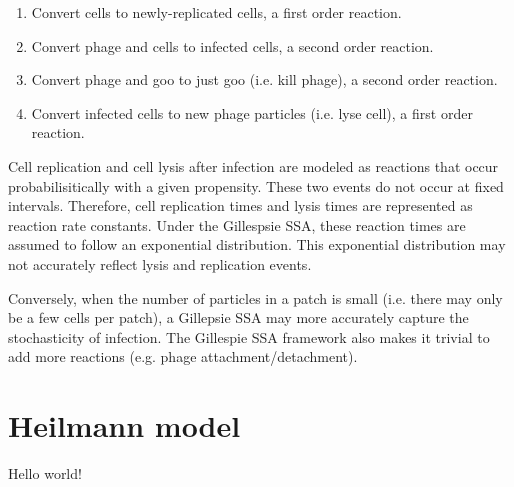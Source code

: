 \documentclass{article}
\begin{document}
\begin{enumerate}
    \item Convert cells to newly-replicated cells, a first order reaction.
    \item Convert phage and cells to infected cells, a second order reaction.
    \item Convert phage and goo to just goo (i.e. kill phage), a second order reaction.
    \item Convert infected cells to new phage particles (i.e. lyse cell), a first order reaction.
\end{enumerate}

Cell replication and cell lysis after infection are modeled as reactions that occur probabilisitically with a given propensity. These two events do not occur at fixed intervals. Therefore, cell replication times and lysis times are represented as reaction rate constants. Under the Gillespsie SSA, these reaction times are assumed to follow an exponential distribution. This exponential distribution may not accurately reflect lysis and replication events.

Conversely, when the number of particles in a patch is small (i.e. there may only be a few cells per patch), a Gillepsie SSA may more accurately capture the stochasticity of infection. The Gillespie SSA framework also makes it trivial to add more reactions (e.g. phage attachment/detachment).


\section{Heilmann model}

Hello world!
\end{document}
